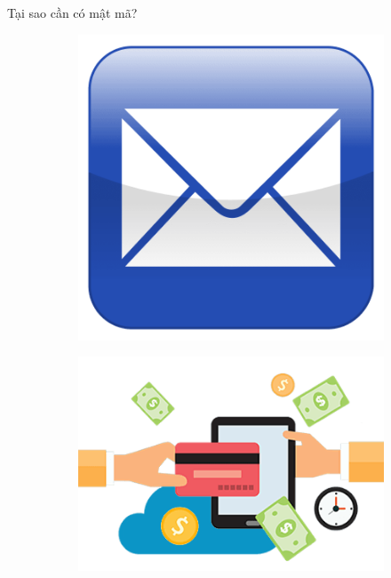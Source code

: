 \documentclass[compress]{beamer}
\begin{document}
\begin{frame}{Tại sao cần có mật mã?}
\begin{figure}[h]
\begin{subfigure}{.35\textwidth}
  \includegraphics[width=1\linewidth]{../email.png}
  \label{fig:sfig2}
\end{subfigure}
\end{figure}
\begin{figure}[h]
\begin{subfigure}{.35\textwidth}
  \centering
  \includegraphics[width=1\linewidth]{../pay.png}
  \label{fig:sfig2}

\end{subfigure}
\end{figure}
\end{frame}
\end{document}
